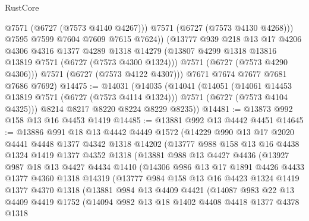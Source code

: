 \begin{lexlean}{RustCore}
\begin{coremodule}
                @7571
                (@6727 (@7573 @4140 @4267)))
              @7571
              (@6727 (@7573 @4130 @4268)))
            @7595
            @7599
            @7604
            @7609
            @7615
            @7624))
        (@13777
          @939
          @218
          @13
          @17
          @4206
          @4306
          @4316
          @1377
          @4289
          @1318
          @14279
          (@13807 @4299 @1318 @13816 @13819 @7571 (@6727 (@7573 @4300 @1324)))
          @7571
          (@6727 (@7573 @4290 @4306)))
        @7571
        (@6727 (@7573 @4122 @4307)))
      @7671
      @7674
      @7677
      @7681
      @7686
      @7692)
@14475 := @14031
    (@14035
      (@14041
        (@14051
          (@14061 @14453 @13819 @7571 (@6727 (@7573 @4114 @1324)))
          @7571
          (@6727 (@7573 @4104 @4325)))
        @8214
        @8217
        @8220
        @8224
        @8229
        @8235))
@14481 := @13873 @992 @158 @13 @16 @4453 @1419
@14485 := @13881 @992 @13 @4442 @4451
@14645 := @13886
    @991
    @18
    @13
    @4442
    @4449
    @1572
    (@14229
      @990
      @13
      @17
      @2020
      @4441
      @4448
      @1377
      @4342
      @1318
      @14202
      (@13777
        @988
        @158
        @13
        @16
        @4438
        @1324
        @1419
        @1377
        @4352
        @1318
        (@13881
          @988
          @13
          @4427
          @4436
          (@13927
            @987
            @18
            @13
            @4427
            @4434
            @1410
            (@14306
              @986
              @13
              @17
              @1891
              @4426
              @4433
              @1377
              @4360
              @1318
              @14319
              (@13777
                @984
                @158
                @13
                @16
                @4423
                @1324
                @1419
                @1377
                @4370
                @1318
                (@13881
                  @984
                  @13
                  @4409
                  @4421
                  (@14087
                    @983
                    @22
                    @13
                    @4409
                    @4419
                    @1752
                    (@14094
                      @982
                      @13
                      @18
                      @1402
                      @4408
                      @4418
                      @1377
                      @4378
                      @1318

\end{coremodule}
\end{lexlean}
